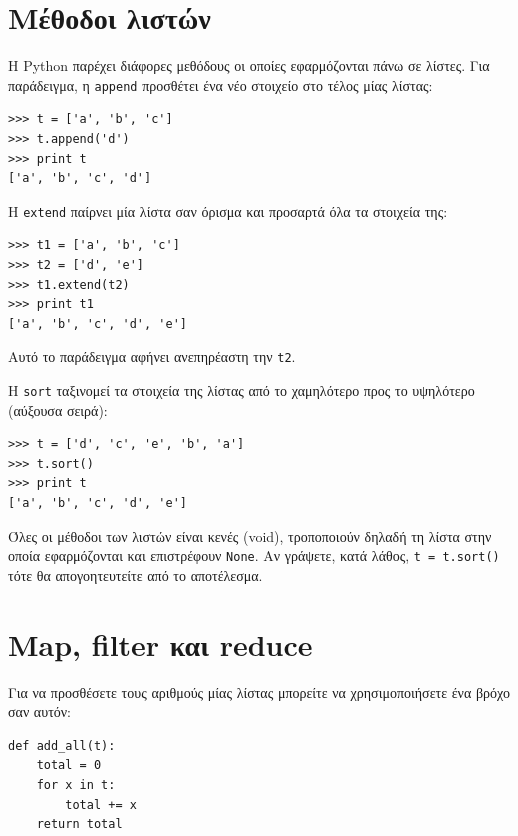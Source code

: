 \documentclass[10pt]{book}
\begin{document}
\section{Μέθοδοι λιστών}

Η Python παρέχει διάφορες μεθόδους οι οποίες εφαρμόζονται πάνω σε λίστες.
Για παράδειγμα, η {\tt append} προσθέτει ένα νέο στοιχείο στο τέλος μίας λίστας:

\begin{verbatim}
>>> t = ['a', 'b', 'c']
>>> t.append('d')
>>> print t
['a', 'b', 'c', 'd']
\end{verbatim}
%

Η {\tt extend} παίρνει μία λίστα σαν όρισμα και προσαρτά όλα τα στοιχεία της:

\begin{verbatim}
>>> t1 = ['a', 'b', 'c']
>>> t2 = ['d', 'e']
>>> t1.extend(t2)
>>> print t1
['a', 'b', 'c', 'd', 'e']
\end{verbatim}
%

Αυτό το παράδειγμα αφήνει ανεπηρέαστη την  {\tt t2}. 

Η {\tt sort} ταξινομεί τα στοιχεία της λίστας από το χαμηλότερο προς το υψηλότερο (αύξουσα σειρά):

\begin{verbatim}
>>> t = ['d', 'c', 'e', 'b', 'a']
>>> t.sort()
>>> print t
['a', 'b', 'c', 'd', 'e']
\end{verbatim}
%

Όλες οι μέθοδοι των λιστών είναι κενές (void), τροποποιούν δηλαδή τη λίστα στην οποία εφαρμόζονται και επιστρέφουν {\tt None}. Αν γράψετε, κατά λάθος, {\tt t = t.sort()} τότε θα απογοητευτείτε από το αποτέλεσμα.


\section{Map, filter και reduce}

Για να προσθέσετε τους αριθμούς μίας λίστας μπορείτε να χρησιμοποιήσετε ένα βρόχο σαν αυτόν:



\begin{verbatim}
def add_all(t):
    total = 0
    for x in t:
        total += x
    return total
\end{verbatim}
%
\end{document}

